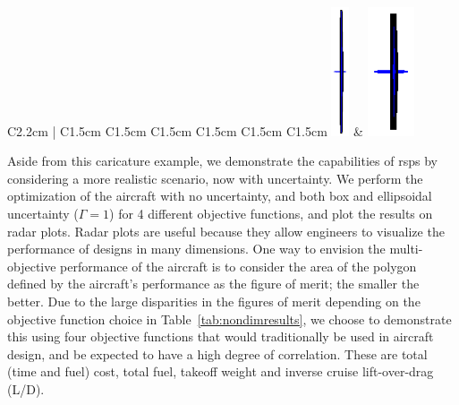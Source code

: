 \begin{table}
{\begin{tabular}{C{2.2cm} | C{1.5cm} C{1.5cm} C{1.5cm} C{1.5cm} C{1.5cm} C{1.5cm}}
    \includegraphics[trim={10.5cm 1.5cm 10.5cm 1.5cm},clip,height=3.8cm]{objtable4.eps} &
    \includegraphics[trim={10.5cm 1.5cm 10.5cm 1.5cm},clip,height=3.8cm]{objtable5.eps}  \\
\hline
\end{tabular}}
\caption{Non-dimensionalized variations in objective values with respect to the aircraft optimized
for different objectives. Objective values are normalized by the total fuel solution.}
    \label{tab:nondimresults}
\end{table}

Aside from this caricature example, we demonstrate the capabilities of \gls{rsp}s
by considering a more realistic scenario, now with uncertainty.
We perform the optimization of the aircraft with no uncertainty, and both box and
ellipsoidal uncertainty ($\Gamma = 1$)
for 4 different objective functions, and plot the results on radar plots.
Radar plots are useful because they allow engineers to visualize the performance
of designs in many dimensions. One way to envision the multi-objective
performance of the aircraft is to consider the area of the polygon defined by the aircraft's
performance as the figure of merit; the smaller the better.
Due to the large disparities in the figures of merit depending on the objective function choice
in Table~\ref{tab:nondimresults}, we choose to demonstrate this using four objective functions
that would traditionally be used in aircraft design, and be expected to have a high degree of correlation.
These are total (time and fuel) cost, total fuel, takeoff weight and inverse cruise lift-over-drag (L/D).

